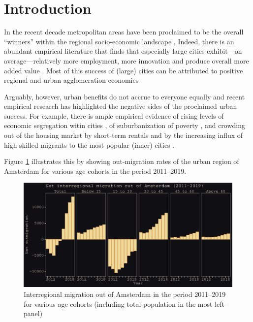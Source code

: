 \documentclass[fleqn,10pt]{SelfArx} %
\affiliation{\textsuperscript{1}\textit{Department of Spatial Economics, Vrije Universiteit Amsterdam, Amsterdam, The Netherlands}} %
\affiliation{*\textbf{Corresponding author}: \Letter{} t.de.graaff@vu.n; \Mundus{} \href{thomasdegraaff.nl}{thomasdegraaff.nl}} %
\begin{document}
\flushbottom
\maketitle
\thispagestyle{empty}


\section{Introduction}

In the recent decade metropolitan areas have been proclaimed to be the overall
``winners'' within the regional socio-economic landscape \citep[]{glaeser2012triumph}.
Indeed, there is an abundant empirical literature that finds that especially
large cities exhibit---on average---relatively more employment, more innovation
and produce overall more added value \citep[see, e.g.,][]{balland2020complex}.
Most of this success of (large) cities can be attributed to positive regional
and urban agglomeration economies \citep[see for recent overviews of the size,
scope and nature of these urban economies][]{melo2009meta, duranton2020,
  rosenthal2020}

Arguably, however, urban benefits do not accrue to everyone equally and recent
empirical research has highlighted the negative sides of the proclaimed urban
success. For example, there is ample empirical evidence of rising levels of
economic segregation witin cities \citep{tammaru2015socio}, of suburbanization
of poverty \citep{hochstenbach2018gentrification}, and crowding out of the
housing market by short-term rentals \citep{koster2018short} and by the
increasing influx of high-skilled migrants to the most popular (inner) cities
\citep{beckers2019residential}.

Figure \ref{fig:adam_mig} illustrates this by showing out-migration rates of the
urban region of Amsterdam for
various age cohorts in the period 2011--2019. 

\begin{figure}[h!]\centering %
 \includegraphics[width=1\linewidth]{../../fig/outmig_amsterdam.pdf}
  \caption{Interregional migration out of Amsterdam in the period 2011--2019 for various age cohorts (including total population in the most left-panel)}
  \label{fig:adam_mig}
\end{figure}
\end{document}
